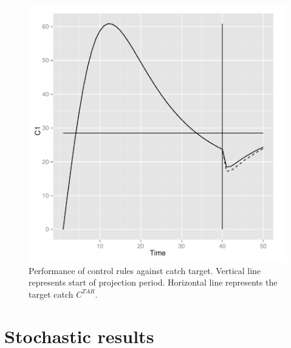 \documentclass[a4paper]{article}
\begin{document}
\begin{figure}
\centering
\includegraphics{script-020}
\caption{Performance of control rules against catch target. Vertical line represents start of projection period. 
Horizontal line represents the target catch $C^{TAR}$.}
\label{fig:hcr_det_catch}
\end{figure}

\section{Stochastic results}
\end{document}
